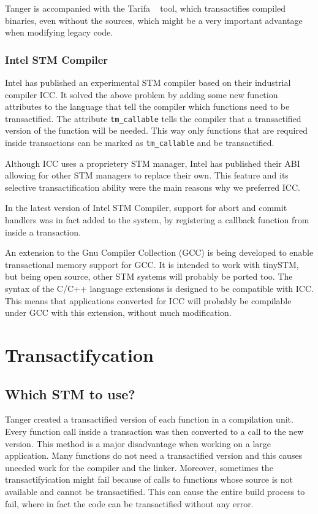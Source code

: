 \documentclass[preprint,natbib,11pt]{sigplanconf}
\begin{document}
{\sc Tanger} is accompanied with the {\sc Tarifa} ~\cite{felber2007tanger}
tool, which transactifies compiled binaries, even without the sources, which
might be a very important advantage when modifying legacy code.

\subsubsection{Intel STM Compiler}
Intel has published\cite{icc} an experimental STM compiler based on their industrial
compiler ICC. It solved the above problem by adding some new function attributes
to the language that tell the compiler which functions need to be transactified.
The attribute {\tt tm\_callable} tells the compiler that a transactified version
of the function will be needed. This way only functions that are required inside
transactions can be marked as {\tt tm\_callable} and be transactified.

Although ICC uses a proprietery STM manager, Intel has published their
ABI\cite{icc:abi} allowing for other STM managers to replace their own. This feature
and its selective transactification ability were the main reasons why we
preferred ICC.

In the latest version of Intel STM Compiler, support for abort and commit
handlers was in fact added to the system, by registering a callback function
from inside a transaction.

An extension to the Gnu Compiler Collection (GCC) is being developed\cite{gcctm} to
enable transactional memory support for GCC. It is intended to work with
tinySTM, but being open source, other STM systems will probably be ported too.
The syntax of the C/C++ language extensions is designed to be compatible with
ICC. This means that applications converted for ICC will probably be compilable
under GCC with this extension, without much modification.

\section{Transactifycation} 
\subsection{Which STM to use?}
{\sc Tanger} created a transactified version of each function in a compilation
unit.  Every function call inside a transaction was then converted to a call to
the new version. This method is a major disadvantage when working on a large
application. Many functions do not need a transactified version and this causes
uneeded work for the compiler and the linker. Moreover, sometimes the
transactifyication might fail because of calls to functions whose source is not
available and cannot be transactified. This can cause the entire build process
to fail, where in fact the code can be transactified without any error.
\end{document}
